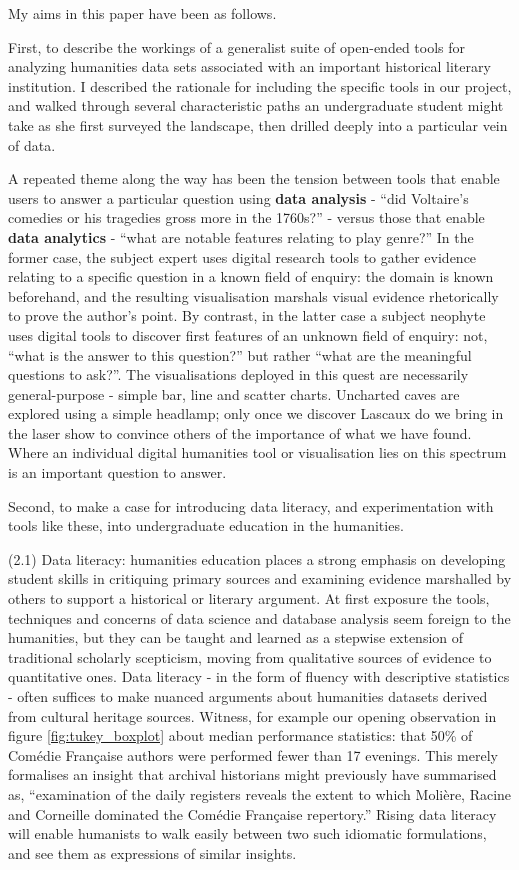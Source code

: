 \documentclass[	DIV=calc,%
							paper=a4,%
							fontsize=11pt,%
							twocolumn]{scrartcl}	 					%
\begin{document}
My aims in this paper have been as follows.

First, to describe the workings of a generalist suite of open-ended tools for analyzing humanities data sets associated with an important historical literary institution.  I described the rationale for including the specific tools in our project, and walked through several characteristic paths an undergraduate student might take as she first surveyed the landscape, then drilled deeply into a particular vein of data.

A repeated theme along the way has been the tension between tools that enable users to answer a particular question using \textbf{data analysis} - ``did Voltaire's comedies or his tragedies gross more in the 1760s?'' - versus those that enable \textbf{data analytics} - ``what are notable features relating to play genre?''  In the former case, the subject expert uses digital research tools to gather evidence relating to a specific question in a known field of enquiry: the domain is known beforehand, and the resulting visualisation marshals visual evidence rhetorically to prove the author's point.  By contrast, in the latter case a subject neophyte uses digital tools to discover first features of an unknown field of enquiry: not, ``what is the answer to this question?'' but rather ``what are the meaningful questions to ask?''.  The visualisations deployed in this quest are necessarily general-purpose - simple bar, line and scatter charts.  Uncharted caves are explored using a simple headlamp; only once we discover Lascaux do we bring in the laser show to convince others of the importance of what we have found.  Where an individual digital humanities tool or visualisation lies on this spectrum is an important question to answer.

Second, to make a case for introducing data literacy, and experimentation with tools like these, into undergraduate education in the humanities.

(2.1) Data literacy: humanities education places a strong emphasis on developing student skills in critiquing primary sources and examining evidence marshalled by others to support a historical or literary argument.  At first exposure the tools, techniques and concerns of data science and database analysis seem foreign to the humanities, but they can be taught and learned as a stepwise extension of traditional scholarly scepticism, moving from qualitative sources of evidence to quantitative ones.  Data literacy - in the form of fluency with descriptive statistics - often suffices to make nuanced arguments about humanities datasets derived from cultural heritage sources.  Witness, for example our opening observation in figure \ref{fig:tukey_boxplot} about median performance statistics: that 50\% of Comédie Française authors were performed fewer than 17 evenings.  This merely formalises an insight that archival historians might previously have summarised as, ``examination of the daily registers reveals the extent to which Molière, Racine and Corneille dominated the Comédie Française repertory.''  Rising data literacy will enable humanists to walk easily between two such idiomatic formulations, and see them as expressions of similar insights.
\end{document}
